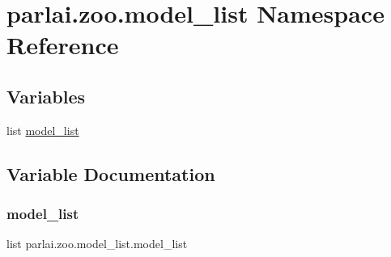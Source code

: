 \hypertarget{namespaceparlai_1_1zoo_1_1model__list}{}\section{parlai.\+zoo.\+model\+\_\+list Namespace Reference}
\label{namespaceparlai_1_1zoo_1_1model__list}
\subsection*{Variables}
\begin{DoxyCompactItemize}
\item 
list \hyperlink{namespaceparlai_1_1zoo_1_1model__list_a53bb54e079b1cbe1ada90d01c8ed8f77}{model\+\_\+list}
\end{DoxyCompactItemize}


\subsection{Variable Documentation}
\mbox{\label{namespaceparlai_1_1zoo_1_1model__list_a53bb54e079b1cbe1ada90d01c8ed8f77}} 
\subsubsection{\texorpdfstring{model\+\_\+list}{model\_list}}
{\footnotesize\ttfamily list parlai.\+zoo.\+model\+\_\+list.\+model\+\_\+list}

